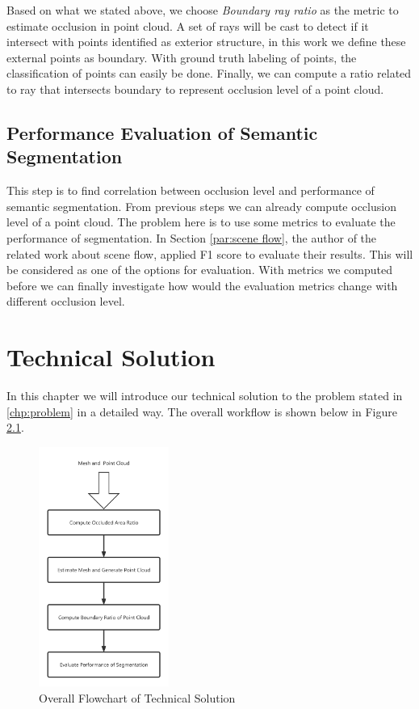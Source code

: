 \documentclass[11pt, a4paper,oneside,chapterprefix=false]{scrbook}
\begin{document}
Based on what we stated above, we choose \emph{Boundary ray ratio} as the metric to estimate occlusion in point cloud. A set of rays will be cast to detect if it intersect with points identified as exterior structure, in this work we define these external points as boundary. With ground truth labeling of points, the classification of points can easily be done. Finally, we can compute a ratio related to ray that intersects boundary to represent occlusion level of a point cloud. 

\section{Performance Evaluation of Semantic Segmentation} \label{sec:performance evaluation}

This step is to find correlation between occlusion level and performance of semantic segmentation. From previous steps we can already compute occlusion level of a point cloud. The problem here is to use some metrics to evaluate the performance of segmentation. In Section \ref{par:scene flow}, the author of the related work about scene flow, applied F1 score to evaluate their results. This will be considered as one of the options for evaluation. With metrics we computed before we can finally investigate how would the evaluation metrics change with different occlusion level. 

\chapter{Technical Solution} \label{chp:solution}

In this chapter we will introduce our technical solution to the problem stated in \ref{chp:problem} in a detailed way. The overall workflow is shown below in Figure \ref{fig:overall flowchart of technical solution}.

\begin{figure}[H]
    \centering
    \includegraphics*[width=0.38\textwidth]{figures/technical solution flowchart.png}
    \caption{Overall Flowchart of Technical Solution}
    \label{fig:overall flowchart of technical solution}
\end{figure}
\end{document}
